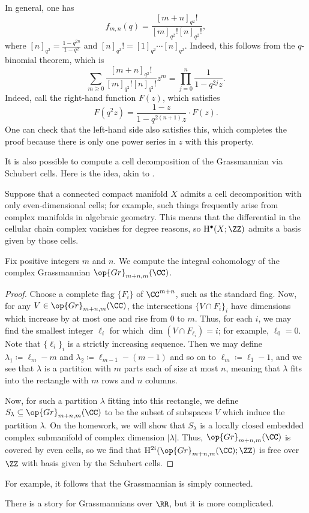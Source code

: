\documentclass[../notes.tex]{subfiles}
\begin{document}
\begin{remark} \label{rem:q-binomial}
	In general, one has
	\[f_{m,n}(q)=\frac{[m+n]_{q^2}!}{[m]_{q^2}![n]_{q^2}!},\]
	where $[n]_{q^2}=\frac{1-q^{2n}}{1-q^2}$ and $[n]_{q^2}!=[1]_{q^2}\cdots[n]_{q^2}$. Indeed, this follows from the $q$-binomial theorem, which is
	\[\sum_{m\ge0}\frac{[m+n]_{q^2}!}{[m]_{q^2}![n]_{q^2}!}z^m=\prod_{j=0}^n\frac1{1-q^{2j}z}.\]
	Indeed, call the right-hand function $F(z)$, which satisfies
	\[F\left(q^2z\right)=\frac{1-z}{1-q^{2(n+1)}z}\cdot F(z).\]
	One can check that the left-hand side also satisfies this, which completes the proof because there is only one power series in $z$ with this property.
\end{remark}
It is also possible to compute a cell decomposition of the Grassmannian via Schubert cells. Here is the idea, akin to .
\begin{remark} \label{rem:even-cells}
	Suppose that a connected compact manifold $X$ admits a cell decomposition with only even-dimen\-sional cells; for example, such things frequently arise from complex manifolds in algebraic geometry. This means that the differential in the cellular chain complex vanishes for degree reasons, so $\mathrm H^\bullet(X;\ZZ)$ admits a basis given by those cells.
\end{remark}
\begin{exe}
	Fix positive integers $m$ and $n$. We compute the integral cohomology of the complex Grassmannian $\op{Gr}_{m+n,m}(\CC)$.
\end{exe}
\begin{proof}
	Choose a complete flag $\{F_i\}$ of $\CC^{m+n}$, such as the standard flag. Now, for any $V\in\op{Gr}_{m+n,m}(\CC)$, the intersections $\{V\cap F_i\}_i$ have dimensions which increase by at most one and rise from $0$ to $m$. Thus, for each $i$, we may find the smallest integer $\ell_i$ for which $\dim(V\cap F_{\ell_i})=i$; for example, $\ell_0=0$. Note that $\{\ell_i\}_i$ is a strictly increasing sequence. Then we may define $\lambda_1\coloneqq\ell_m-m$ and $\lambda_2\coloneqq\ell_{m-1}-(m-1)$ and so on to $\ell_m\coloneqq\ell_1-1$, and we see that $\lambda$ is a partition with $m$ parts each of size at most $n$, meaning that $\lambda$ fits into the rectangle with $m$ rows and $n$ columns.

	Now, for such a partition $\lambda$ fitting into this rectangle, we define $S_\lambda\subseteq\op{Gr}_{m+n,m}(\CC)$ to be the subset of subspaces $V$ which induce the partition $\lambda$. On the homework, we will show that $S_\lambda$ is a locally closed embedded complex submanifold of complex dimension $\left|\lambda\right|$. Thus, $\op{Gr}_{m+n,m}(\CC)$ is covered by even cells, so we find that $\mathrm H^{2i}(\op{Gr}_{m+n,m}(\CC);\ZZ)$ is free over $\ZZ$ with basis given by the Schubert cells.
\end{proof}
\begin{remark}
	For example, it follows that the Grassmannian is simply connected.
\end{remark}
\begin{remark}
	There is a story for Grassmannians over $\RR$, but it is more complicated.
\end{remark}
\end{document}
